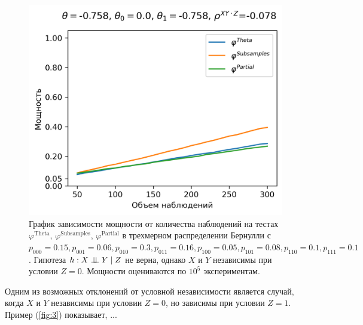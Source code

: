 \begin{figure}[H]
    \centering
    \includegraphics[scale=0.55]{images/graph3.png}
    \caption{График зависимости мощности от количества наблюдений
    на тестах $\varphi^{\text{Theta}}$, $\varphi^{\text{Subsamples}}$, $\varphi^{\text{Partial}}$
    в трехмерном распределении Бернулли с $p_{000}=0.15, p_{001}=0.06, 
    p_{010}=0.3, p_{011}=0.16,
    p_{100}=0.05, p_{101}=0.08, p_{110}=0.1, p_{111}=0.1$. 
    Гипотеза $h: X \perp\!\!\!\perp Y \mid Z$ не верна, однако $X$ и $Y$ независимы
    при условии $Z=0$. 
    Мощности оцениваются по $10^5$ экспериментам.}\label{fig:3}
\end{figure}

Одним из возможных отклонений от условной независимости является случай,
когда $X$ и $Y$ независимы при условии $Z=0$, но зависимы при условии $Z=1$.
Пример (\autoref{fig:3}) показывает, ...

